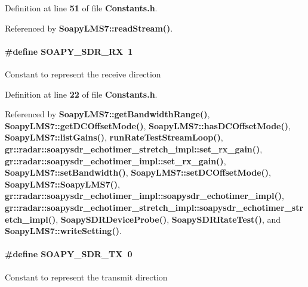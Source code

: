 Definition at line {\bf 51} of file {\bf Constants.\+h}.



Referenced by {\bf Soapy\+L\+M\+S7\+::read\+Stream()}.

\paragraph[{S\+O\+A\+P\+Y\+\_\+\+S\+D\+R\+\_\+\+RX}]{\setlength{\rightskip}{0pt plus 5cm}\#define S\+O\+A\+P\+Y\+\_\+\+S\+D\+R\+\_\+\+RX~1}\label{Constants_8h_a486722a072557481f88ea132a60dda71}
Constant to represent the receive direction 

Definition at line {\bf 22} of file {\bf Constants.\+h}.



Referenced by {\bf Soapy\+L\+M\+S7\+::get\+Bandwidth\+Range()}, {\bf Soapy\+L\+M\+S7\+::get\+D\+C\+Offset\+Mode()}, {\bf Soapy\+L\+M\+S7\+::has\+D\+C\+Offset\+Mode()}, {\bf Soapy\+L\+M\+S7\+::list\+Gains()}, {\bf run\+Rate\+Test\+Stream\+Loop()}, {\bf gr\+::radar\+::soapysdr\+\_\+echotimer\+\_\+stretch\+\_\+impl\+::set\+\_\+rx\+\_\+gain()}, {\bf gr\+::radar\+::soapysdr\+\_\+echotimer\+\_\+impl\+::set\+\_\+rx\+\_\+gain()}, {\bf Soapy\+L\+M\+S7\+::set\+Bandwidth()}, {\bf Soapy\+L\+M\+S7\+::set\+D\+C\+Offset\+Mode()}, {\bf Soapy\+L\+M\+S7\+::\+Soapy\+L\+M\+S7()}, {\bf gr\+::radar\+::soapysdr\+\_\+echotimer\+\_\+impl\+::soapysdr\+\_\+echotimer\+\_\+impl()}, {\bf gr\+::radar\+::soapysdr\+\_\+echotimer\+\_\+stretch\+\_\+impl\+::soapysdr\+\_\+echotimer\+\_\+stretch\+\_\+impl()}, {\bf Soapy\+S\+D\+R\+Device\+Probe()}, {\bf Soapy\+S\+D\+R\+Rate\+Test()}, and {\bf Soapy\+L\+M\+S7\+::write\+Setting()}.

\paragraph[{S\+O\+A\+P\+Y\+\_\+\+S\+D\+R\+\_\+\+TX}]{\setlength{\rightskip}{0pt plus 5cm}\#define S\+O\+A\+P\+Y\+\_\+\+S\+D\+R\+\_\+\+TX~0}\label{Constants_8h_a02507340cdc4a2bb99d2f5ce698ea21f}
Constant to represent the transmit direction 

